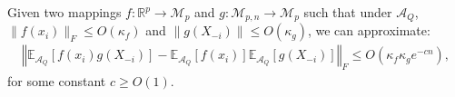 \documentclass[a4papaer, titlepage]{book}
\begin{document}
\begin{lemma}\label{lem:independence_under_A_Q}
  Given two mappings $f: \mathbb R^p \to \mathcal M_{p}$ and $g: \mathcal M_{p,n} \to \mathcal M_{p}$ such that under $\mathcal A_Q$, $\|f(x_i)\|_F \leq O(\kappa_f)$ and $\|g(X_{-i})\| \leq O(\kappa_g)$, we can approximate:
  \begin{align*}
    \left\Vert \mathbb E_{\mathcal A_Q}[f(x_i)g(X_{-i})] - \mathbb E_{\mathcal A_Q}[f(x_i)] \mathbb E_{\mathcal A_Q}[g(X_{-i})] \right\Vert_F \leq O \left(\kappa_f\kappa_g e^{-cn}\right),
  \end{align*}
  for some constant $c \geq O(1)$.
\end{lemma}
\end{document}
